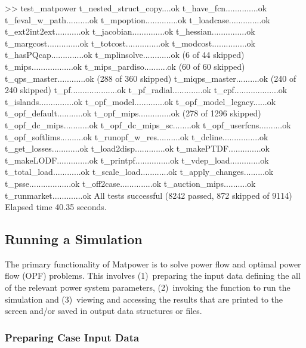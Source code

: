 \documentclass[12pt]{article}
\newcommand{\matpower}[0]{{\sc Matpower}}
\numberwithin{equation}{section}
\numberwithin{table}{section}
\numberwithin{figure}{section}
\begin{document}
\begin{enumerate}
\begin{Code}
>> test_matpower
t_nested_struct_copy....ok
t_have_fcn..............ok
t_feval_w_path..........ok
t_mpoption..............ok
t_loadcase..............ok
t_ext2int2ext...........ok
t_jacobian..............ok
t_hessian...............ok
t_margcost..............ok
t_totcost...............ok
t_modcost...............ok
t_hasPQcap..............ok
t_mplinsolve............ok (6 of 44 skipped)
t_mips..................ok
t_mips_pardiso..........ok (60 of 60 skipped)
t_qps_master............ok (288 of 360 skipped)
t_miqps_master..........ok (240 of 240 skipped)
t_pf....................ok
t_pf_radial.............ok
t_cpf...................ok
t_islands...............ok
t_opf_model.............ok
t_opf_model_legacy......ok
t_opf_default...........ok
t_opf_mips..............ok (278 of 1296 skipped)
t_opf_dc_mips...........ok
t_opf_dc_mips_sc........ok
t_opf_userfcns..........ok
t_opf_softlims..........ok
t_runopf_w_res..........ok
t_dcline................ok
t_get_losses............ok
t_load2disp.............ok
t_makePTDF..............ok
t_makeLODF..............ok
t_printpf...............ok
t_vdep_load.............ok
t_total_load............ok
t_scale_load............ok
t_apply_changes.........ok
t_psse..................ok
t_off2case..............ok
t_auction_mips..........ok
t_runmarket.............ok
All tests successful (8242 passed, 872 skipped of 9114)
Elapsed time 40.35 seconds.
\end{Code}
\end{enumerate}

\subsection{Running a Simulation}
\label{sec:runsimulation}

The primary functionality of \matpower{} is to solve power flow and optimal power flow (OPF) problems. This involves (1)~preparing the input data defining the all of the relevant power system parameters, (2)~invoking the function to run the simulation and (3)~viewing and accessing the results that are printed to the screen and/or saved in output data structures or files.

\subsubsection{Preparing Case Input Data}
\label{sec:prepdata}
\end{document}
